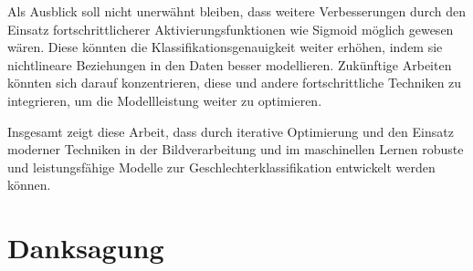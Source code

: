 \documentclass[journal,twoside,web]{ieeecolor}
\begin{document}
Als Ausblick soll nicht unerwähnt bleiben, dass weitere Verbesserungen durch den Einsatz fortschrittlicherer Aktivierungsfunktionen wie Sigmoid möglich gewesen wären. Diese könnten die Klassifikationsgenauigkeit weiter erhöhen, indem sie nichtlineare Beziehungen in den Daten besser modellieren. Zukünftige Arbeiten könnten sich darauf konzentrieren, diese und andere fortschrittliche Techniken zu integrieren, um die Modellleistung weiter zu optimieren.

Insgesamt zeigt diese Arbeit, dass durch iterative Optimierung und den Einsatz moderner Techniken in der Bildverarbeitung und im maschinellen Lernen robuste und leistungsfähige Modelle zur Geschlechterklassifikation entwickelt werden können.




\appendices


\section*{Danksagung}
\end{document}
